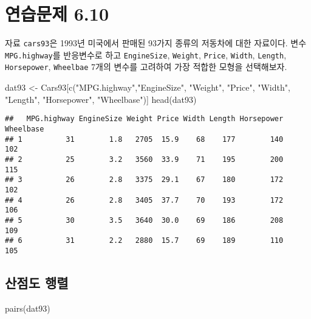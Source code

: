 \documentclass[
]{book}
\newenvironment{Shaded}{\begin{snugshade}}{\end{snugshade}}
\newcommand{\FunctionTok}[1]{\textcolor[rgb]{0.00,0.00,0.00}{#1}}
\newcommand{\NormalTok}[1]{#1}
\newcommand{\OtherTok}[1]{\textcolor[rgb]{0.56,0.35,0.01}{#1}}
\newcommand{\StringTok}[1]{\textcolor[rgb]{0.31,0.60,0.02}{#1}}
\begin{document}
\hypertarget{uxc5f0uxc2b5uxbb38uxc81c-6.10}{%
\section{연습문제 6.10}\label{uxc5f0uxc2b5uxbb38uxc81c-6.10}}

자료 \texttt{cars93}은 1993년 미국에서 판매된 93가지 종류의 저동차에 대한 자료이다. 변수 \texttt{MPG.highway}를 반응변수로 하고 \texttt{EngineSize}, \texttt{Weight}, \texttt{Price}, \texttt{Width}, \texttt{Length}, \texttt{Horsepower}, \texttt{Wheelbae} 7개의 변수를
고려하여 가장 적합한 모형을 선택해보자.

\begin{Shaded}
\begin{Highlighting}[]
\NormalTok{dat93 }\OtherTok{\textless{}{-}}\NormalTok{ Cars93[}\FunctionTok{c}\NormalTok{(}\StringTok{"MPG.highway"}\NormalTok{,}\StringTok{"EngineSize"}\NormalTok{, }\StringTok{"Weight"}\NormalTok{, }\StringTok{"Price"}\NormalTok{, }\StringTok{"Width"}\NormalTok{, }\StringTok{"Length"}\NormalTok{, }\StringTok{"Horsepower"}\NormalTok{, }\StringTok{"Wheelbase"}\NormalTok{)]}
\FunctionTok{head}\NormalTok{(dat93)}
\end{Highlighting}
\end{Shaded}

\begin{verbatim}
##   MPG.highway EngineSize Weight Price Width Length Horsepower Wheelbase
## 1          31        1.8   2705  15.9    68    177        140       102
## 2          25        3.2   3560  33.9    71    195        200       115
## 3          26        2.8   3375  29.1    67    180        172       102
## 4          26        2.8   3405  37.7    70    193        172       106
## 5          30        3.5   3640  30.0    69    186        208       109
## 6          31        2.2   2880  15.7    69    189        110       105
\end{verbatim}

\hypertarget{uxc0b0uxc810uxb3c4-uxd589uxb82c-1}{%
\subsection{산점도 행렬}\label{uxc0b0uxc810uxb3c4-uxd589uxb82c-1}}

\begin{Shaded}
\begin{Highlighting}[]
\FunctionTok{pairs}\NormalTok{(dat93)}
\end{Highlighting}
\end{Shaded}
\end{document}
